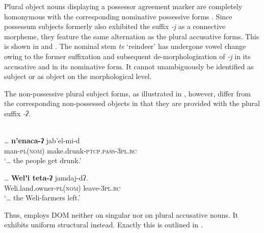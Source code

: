 \documentclass[output=paper]{LSP/langsci}
\begin{document}
Plural object nouns displaying a possessor agreement marker are completely homonymous with the corresponding nominative possessive forms \citep[59]{Nikolaeva2014Grammar}. Since possessum subjects formerly also exhibited the suffix \textit{-j} as a connective morpheme, they feature the same alternation as the plural accusative forms. This is shown in  and . The nominal stem \textit{te} ‘reindeer’ has undergone vowel change owing to the former suffixation and subsequent de-morphologiza\-tion of \textit{-j} in its accusative and in its nominative form. It cannot unambiguously be identified as subject or as object on the morphological level. 


The non-possessive plural subject forms, as illustrated in , however, differ from the corresponding non-possessed objects in that they are provided with the plural suffix \textit{-ʔ}.

\ea \label{12-wr-ex:14}%
\\
\ea  \label{12-wr-ex:14a}
\gll … \textbf{n’enaca-ʔ} jab’el-mi-d\\
{ } man-\textsc{pl(nom)} make.drunk-\textsc{ptcp.pass-3pl.rc}\\
\glt  ‘… the people get drunk.’

\ex \label{12-wr-ex:14b}
\gll  … \textbf{Welʼi teta-ʔ} jamdaj-dʔ.\\
{ } Weli.land.owner-\textsc{pl(nom)} leave-\textsc{3pl.rc}\\
\glt ‘… the Weli-farmers left.’
\z
\z

\hspace*{-0.7pt}Thus,  employs DOM neither on singular nor on plural accusative nouns. It exhibits uniform structural  instead. Exactly this is outlined in .
\end{document}
